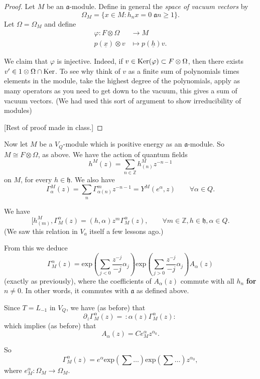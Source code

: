 \begin{proof}
Let $M$ be an $\mathfrak{a}$-module.
Define in general the {\it space of vacuum
vectors} by
$$
\Omega_M=\{x \in M:h_nx=0\;\mathfrak{a}n\geq
1\}.
$$
Let $\Omega=\Omega_M$ and define
$$
\begin{aligned}
\varphi: F \otimes \Omega &\longrightarrow M
\\
p(\underline{x})\otimes v &\longmapsto
p(\underline{h})v.
\end{aligned}
$$

\noindent
We claim that $\varphi$ is injective. Indeed,
if $v \in \mathop{\mathrm{Ker}}(\varphi)\subset F \otimes
\Omega$, then
there exists $v' \in 1 \otimes \Omega \cap
\mathop{\mathrm{Ker}}$.
To see why think of $v$ as a finite sum of
polynomials
times elements in the module, take the
highest degree of the polynomials,
apply as many operators as you need to get
down to the vacuum,
this gives a sum of vacuum vectors.
(We had used this sort of argument to show
irreducibility of modules)

[Rest of proof made in class.]
\end{proof}



\medskip\noindent
Now let $M$ be a $V_Q$-module which is
positive
energy as an $\mathfrak{a}$-module.
So $M \cong F \otimes \Omega$, as above.
We have the action of quantum fields
$$
h^M(z)=\sum_{n \in \mathbb{Z}}h_{(n)}^M
z^{-n-1}
$$
on $M$, for every $h \in \mathfrak{h}$.
We also have
$$
\Gamma^M_\alpha(z)=\sum_n\Gamma^m_{\alpha(n)}
z^{-n-1}
=Y^M(e^\alpha,z)\qquad \forall \alpha\in Q.
$$

We have
$$
[h^M_{(m)},\Gamma^\alpha_M(z)=
(h,\alpha)z^m\Gamma^\alpha_M(z),
\qquad \forall m \in \mathbb{Z},h \in
\mathfrak{h}, \alpha \in Q.
$$
(We saw this relation in $V_a$ itself a few
lessons ago.)

From this we deduce
$$
\Gamma^\alpha_M(z)=
\text{exp}\left(\sum_{j<0}\frac{z^{-j}}{-j}
\alpha_j\right)
\text{exp}\left(\sum_{j>0}\frac{z^{-j}}{-j}
\alpha_j\right)
A_\alpha(z)
$$
(exactly as previously),
where the coefficients of $A_\alpha(z)$
commute with all
$h_n$ {\bf for $n \neq 0$}.
In other words, it commutes with
$\mathfrak{a}$ as defined above.

Since $T=L_{-1}$ in $V_Q$,
we have (as before) that
$$
\partial_z\Gamma^\alpha_M(z)=\,:\!\alpha(z)
\Gamma^\alpha_M(z)\!:\,
$$
which implies (as before) that
$$
A_\alpha(z)=Ce_M^\alpha z^{\alpha_0}.
$$

So
$$
\Gamma^\alpha_M(z)=e^\alpha
\text{exp}(\sum\ldots)
\text{exp}(\sum\ldots)
z^{\alpha_0},
$$
where $e_M^\alpha:\Omega_M \to \Omega_M$.

